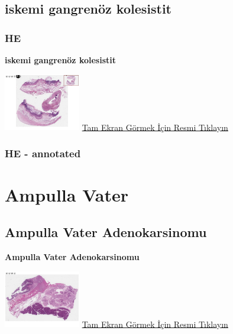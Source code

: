 \documentclass[
  letterpaper,
  DIV=11,
  numbers=noendperiod]{scrreprt}
\begin{document}
\hypertarget{sec-ischemia-gangrenous-cholecystitis}{%
\section{iskemi gangrenöz
kolesistit}\label{sec-ischemia-gangrenous-cholecystitis}}

\hypertarget{he-9}{%
\subsection{HE}\label{he-9}}

\textbf{iskemi gangrenöz kolesistit}

\href{https://images.patolojiatlasi.com/ischemia-gangrenous-cholecystitis/HE.html}{\includegraphics[width=0.25\textwidth,height=\textheight]{./screenshots/thumbnail_ischemia-gangrenous-cholecystitis.png}}
\href{https://images.patolojiatlasi.com/ischemia-gangrenous-cholecystitis/HE.html}{Tam
Ekran Görmek İçin Resmi Tıklayın}

\hypertarget{he---annotated-1}{%
\subsection{HE - annotated}\label{he---annotated-1}}

\hypertarget{sec-ampulla-vater}{%
\chapter{Ampulla Vater}\label{sec-ampulla-vater}}

\hypertarget{sec-ampulla-vater-adenokarsinomu}{%
\section{Ampulla Vater
Adenokarsinomu}\label{sec-ampulla-vater-adenokarsinomu}}

\textbf{Ampulla Vater Adenokarsinomu}

\href{https://images.patolojiatlasi.com/ampullary-adenocarcinoma/HE.html}{\includegraphics[width=0.25\textwidth,height=\textheight]{./screenshots/thumbnail_ampullary-adenocarcinoma.png}}
\href{https://images.patolojiatlasi.com/ampullary-adenocarcinoma/HE.html}{Tam
Ekran Görmek İçin Resmi Tıklayın}
\end{document}

